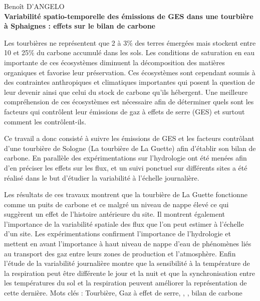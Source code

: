{\parindent0pt %

\begin{center}
		\large{Benoît D'ANGELO}\\ 
		\textbf{Variabilité spatio-temporelle des émissions de GES dans une tourbière à Sphaignes : effets sur le bilan de carbone}
\end{center}

\begin{framed}
	\begin{minipage}{\dimexpr\textwidth-2\fboxrule-2\fboxsep}
	Les tourbières ne représentent que 2 à 3\% des terres émergées mais stockent entre 10 et 25\% du carbone accumulé dans les sols.
	Les conditions de saturation en eau importante de ces écosystèmes diminuent la décomposition des matières organiques et favorise leur préservation.
	Ces écosystèmes sont cependant soumis à des contraintes anthropiques et climatiques importantes qui posent la question de leur devenir ainsi que celui du stock de carbone qu'ils hébergent.
	Une meilleure compréhension de ces écosystèmes est nécessaire afin de déterminer quels sont les facteurs qui contrôlent leur émissions de gaz à effets de serre (GES) et surtout comment les contrôlent-ils.\par
	Ce travail a donc consisté à suivre les émissions de GES et les facteurs contrôlant d'une tourbière de Sologne (La tourbière de La Guette) afin d'établir son bilan de carbone.
	En parallèle des expérimentations sur l'hydrologie ont été menées afin d'en préciser les effets sur les flux, et un suivi ponctuel sur différents sites a été réalisé dans le but d'étudier la variabilité à l'échelle journalière.\par
	Les résultats de ces travaux montrent que la tourbière de La Guette fonctionne comme un puits de carbone et ce malgré un niveau de nappe élevé ce qui suggèrent un effet de l'histoire antérieure du site.
	Il montrent également l'importance de la variabilité spatiale des flux que l'on peut estimer à l'échelle d'un site.
	Les expérimentations confirment l'importance de l'hydrologie et mettent en avant l'importance à haut niveau de nappe d'eau de phénomènes liés au transport des gaz entre leurs zones de production et l'atmosphère.
	Enfin l'étude de la variabilité journalière montre que la sensibilité à la température de la respiration peut être différente le jour et la nuit et que la synchronisation entre les températures du sol et la respiration peuvent améliorer la représentation de cette dernière.
Mots cl\'es : Tourbière, Gaz à effet de serre, \coo, \chh, bilan de carbone
	\end{minipage}
\end{framed}

}
